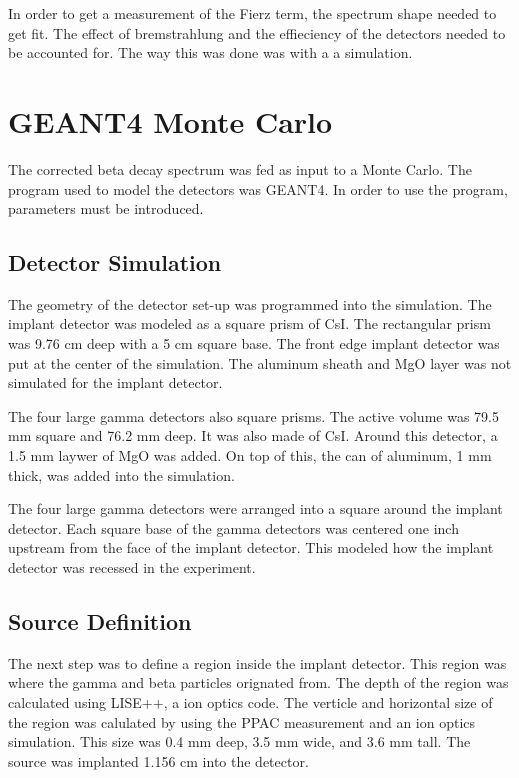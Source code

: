 

In order to get a measurement of the Fierz term, the spectrum shape needed to get fit.
The effect of bremstrahlung and the effieciency of the detectors needed to be accounted for.
The way this was done was with a a simulation.

\section{GEANT4 Monte Carlo}
The corrected beta decay spectrum was fed as input to a Monte Carlo.
The program used to model the detectors was GEANT4.
In order to use the program, parameters must be introduced.

\subsection{Detector Simulation}
The geometry of the detector set-up was programmed into the simulation.
The implant detector was modeled as a square prism of CsI.
The rectangular prism was 9.76 cm deep with a 5 cm square base.
The front edge implant detector was put at the center of the simulation.
The aluminum sheath and MgO layer was not simulated for the implant detector.

The four large gamma detectors also square prisms.
The active volume was 79.5 mm square and 76.2 mm deep.
It was also made of CsI.
Around this detector, a 1.5 mm laywer of MgO was added.
On top of this, the can of aluminum, 1 mm thick, was added into the simulation.

The four large gamma detectors were arranged into a square around the implant detector.
Each square base of the gamma detectors was centered one inch upstream from the face of the implant detector.
This modeled how the implant detector was recessed in the experiment. 

\subsection{Source Definition}
The next step was to define a region inside the implant detector.
This region was where the gamma and beta particles orignated from.
The depth of the region was calculated using LISE++, a ion optics code.
The verticle and horizontal size of the region was calulated by using the PPAC measurement and an ion optics simulation.
This size was 0.4 mm deep, 3.5 mm wide, and 3.6 mm tall.
The source was implanted 1.156 cm into the detector.

